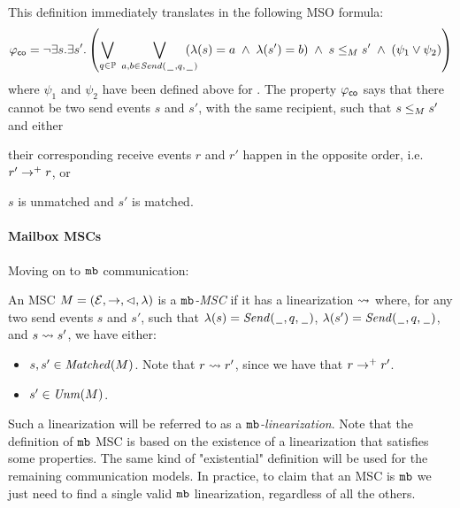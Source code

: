 This definition immediately translates in the following MSO formula:
\[
	\varphi_{\mathsf{co}} = \neg \exists s.\exists s'. \left(
	\bigvee_{\substack{q \in \mathbb{P}}}\;
	\bigvee_{\substack{a,b \in {\mathit{Send}(\hspace{0.1em}\underline{\hspace{0.5em}}\hspace{0.1em},q,\hspace{0.1em}\underline{\hspace{0.5em}}\hspace{0.1em})}}}\hspace{-1em}
	(\lambda(s) = a \;\wedge\; \lambda(s') = b) \;\wedge\; s \le_M s' \;\wedge\;
	(\psi_1 \vee \psi_2 ) 	
	\right)
\]
where $\psi_1$ and $\psi_2$ have been defined above for \pp. The property $\varphi_{\mathsf{co}}$ says that there cannot be two send events $s$ and $s'$, with the same recipient, such that $s \le_M s'$ and either
\begin{enumerate*}[label={(\roman*)}]
	\item their corresponding receive events $r$ and $r'$ happen in the opposite order, i.e. $r' \to^+ r$, or
	\item $s$ is unmatched and $s'$ is matched.
\end{enumerate*}


\paragraph{\bf Mailbox MSCs}
Moving on to $\mathtt{mb}$ communication:

\begin{definition}\label{def:mb_msc}
An MSC $M = (\mathcal{E},\to,\lhd,\lambda)$ is a \emph{$\mathtt{mb}$-MSC} if it has a linearization $\rightsquigarrow$ where, for any two send events $s$ and $s'$, such that $\lambda(s)={\mathit{Send}(\hspace{0.1em}\underline{\hspace{0.5em}}\hspace{0.1em},q,\hspace{0.1em}\underline{\hspace{0.5em}}\hspace{0.1em})}$, $\lambda(s')={\mathit{Send}(\hspace{0.1em}\underline{\hspace{0.5em}}\hspace{0.1em},q,\hspace{0.1em}\underline{\hspace{0.5em}}\hspace{0.1em})}$, and $s \rightsquigarrow s'$, we have either:
\begin{itemize}%
	\item $s,s' \in \mathit{Matched}(M)$. Note that $r \rightsquigarrow r'$, since we have that $r \to^+ r'$.
	\item $s' \in \mathit{Unm}(M)$.
\end{itemize}
\end{definition}


Such a linearization will be referred to as a \emph{$\mathtt{mb}$-linearization}. Note that the definition of $\mathtt{mb}$ MSC is based on the existence of a linearization that satisfies some properties. The same kind of "existential" definition will be used for the remaining communication models. In practice, to claim that an MSC is $\mathtt{mb}$ we just need to find a single valid $\mathtt{mb}$ linearization, regardless of all the others.%



